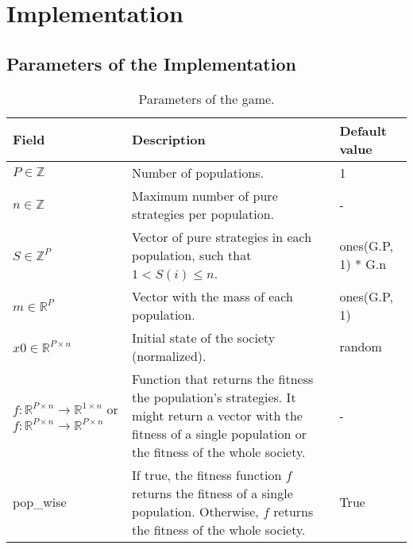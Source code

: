 \section{Implementation} \label{sec:implementation}

\subsection{Parameters of the Implementation}


\begin{table}[tbh]
\begin{center}
\begin{tabular}{p{} | p{} | p{}}\hline
Field & Description & Default value\\ \hline
$P\in\mathbb{Z}$ & Number of populations. & 1 \\
$n\in\mathbb{Z}$ & Maximum number of pure strategies per population. & - \\
$S\in\mathbb{Z}^{P}$ & Vector of pure strategies in each population, such that $1<S(i)\leq n$. & ones(G.P, 1) * G.n \\
$m\in\mathbb{R}^P$ & Vector with the mass of each population. & ones(G.P, 1) \\
$x0\in\mathbb{R}^{P\times n}$ & Initial state of the society (normalized). & random \\
$f:\mathbb{R}^{P\times n} \rightarrow \mathbb{R}^{1\times n}$ or $f:\mathbb{R}^{P\times n} \rightarrow \mathbb{R}^{P\times n}$ & Function that returns the fitness the population's strategies. It might return a vector with the fitness of a single population or the fitness of the whole society. & - \\ 
pop\_wise & If true, the fitness function $f$ returns the fitness of a single population. Otherwise, $f$ returns the fitness of the whole society. & True \\
\hline
\end{tabular}
\end{center}
\caption{Parameters of the game.}
\label{tab:game}
\end{table}



